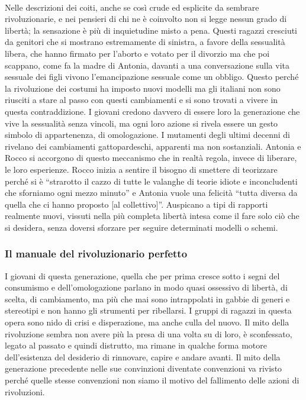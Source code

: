 \paragraph{}Nelle descrizioni dei coiti, anche se così crude ed esplicite da sembrare rivoluzionarie, e nei pensieri di chi ne è coinvolto non si legge nessun grado di libertà; la sensazione è più di inquietudine misto a pena.
Questi ragazzi cresciuti da genitori che si mostrano estremamente di sinistra, a favore della sessualità libera, che hanno firmato per l'aborto e votato per il divorzio ma che poi scappano, come fa  la madre di Antonia, davanti a una conversazione sulla vita sessuale dei figli vivono l'emancipazione sessuale come un obbligo.
Questo perché la rivoluzione dei costumi ha imposto nuovi modelli ma gli italiani non sono riusciti a stare al passo con questi cambiamenti e si sono trovati a vivere in questa contraddizione.
I giovani credono davvero di essere loro la generazione che vive la sessualità senza vincoli, ma ogni loro azione si rivela essere un gesto simbolo di appartenenza, di omologazione.
I mutamenti degli ultimi decenni di rivelano dei cambiamenti gattopardeschi, apparenti ma non sostanziali.
Antonia e Rocco si accorgono di questo meccanismo che in realtà regola, invece di liberare, le loro esperienze.
Rocco inizia a sentire il bisogno di smettere di teorizzare perché si è \enquote{strarotto il cazzo di tutte le valanghe di teorie idiote e inconcludenti che sforniamo ogni mezzo minuto} e Antonia vuole una felicità \enquote{tutta diversa da quella che ci hanno proposto [al collettivo]}.
Auspicano a tipi di rapporti realmente nuovi, vissuti nella più completa libertà intesa come il fare solo ciò che si desidera, senza doversi sforzare per seguire determinati modelli o schemi. 



\subsubsection{Il manuale del rivoluzionario perfetto}

I giovani di questa generazione, quella che per prima cresce sotto i segni del consumismo e dell'omologazione parlano in modo quasi ossessivo di libertà, di scelta, di cambiamento, ma più che mai sono intrappolati in gabbie di generi e stereotipi e non hanno gli strumenti per ribellarsi.
I gruppi di ragazzi in questa opera sono nido di crisi e disperazione, ma anche culla del nuovo.
Il mito della rivoluzione sembra non avere più la presa di una volta su di loro, è sconfessato, legato al passato e quindi distrutto, ma rimane in qualche forma motore dell'esistenza del desiderio di rinnovare, capire e andare avanti.
Il mito della generazione precedente nelle sue convinzioni diventate convenzioni va rivisto perché quelle stesse convenzioni non siamo il motivo del fallimento delle azioni di rivoluzioni.

